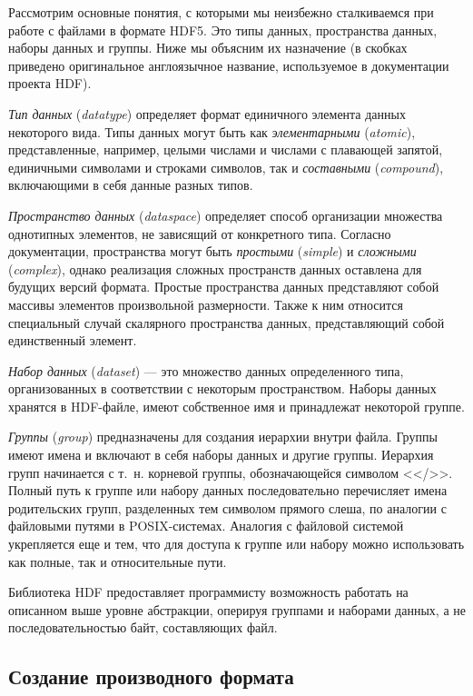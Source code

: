 Рассмотрим основные понятия, с которыми мы неизбежно сталкиваемся при работе
с файлами в формате HDF5. Это типы данных, пространства данных, наборы данных
и группы. Ниже мы объясним их назначение (в скобках приведено оригинальное
англоязычное название, используемое в документации проекта HDF).

\emph{Тип данных} (\emph{datatype}) определяет формат единичного элемента
данных некоторого вида. Типы данных могут быть как \emph{элементарными}
(\emph{atomic}), представленные, например, целыми числами и числами с плавающей
запятой, единичными символами и строками символов, так и \emph{составными}
(\emph{compound}), включающими в себя данные разных типов.

\emph{Пространство данных} (\emph{dataspace}) определяет способ организации
множества однотипных элементов, не зависящий от конкретного типа. Согласно
документации, пространства могут быть \emph{простыми} (\emph{simple})
и \emph{сложными} (\emph{complex}), однако реализация сложных пространств данных
оставлена для будущих версий формата. Простые пространства данных представляют
собой массивы элементов произвольной размерности. Также к ним относится
специальный случай скалярного пространства данных, представляющий собой
единственный элемент.

\emph{Набор данных} (\emph{dataset}) --- это множество данных определенного
типа, организованных в соответствии с некоторым пространством. Наборы данных
хранятся в HDF-файле, имеют собственное имя и принадлежат некоторой группе.

\emph{Группы} (\emph{group}) предназначены для создания иерархии внутри файла.
Группы имеют имена и включают в себя наборы данных и другие группы. Иерархия
групп начинается с т.~н. корневой группы, обозначающейся символом <</>>.
Полный путь к группе или набору данных последовательно перечисляет имена
родительских групп, разделенных тем символом прямого слеша, по аналогии
с файловыми путями в POSIX-системах. Аналогия с файловой системой укрепляется
еще и тем, что для доступа к группе или набору можно использовать как полные,
так и относительные пути.

Библиотека HDF предоставляет программисту возможность работать на описанном выше
уровне абстракции, оперируя группами и наборами данных, а не последовательностью
байт, составляющих файл.


\subsection{Создание производного формата}

